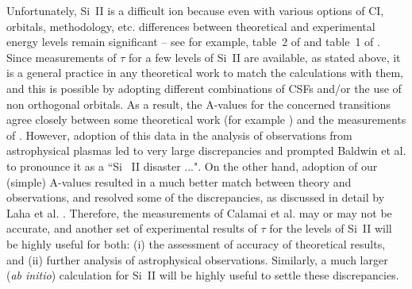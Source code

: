 \documentclass[fleqn]{article}
\begin{document}
Unfortunately, Si~II is a difficult ion because even with various options of CI, orbitals, methodology, etc. differences between theoretical and experimental energy levels remain significant -- see for example, table~2 of \cite{baut1} and table~1 of \cite{sstsi2a}. Since measurements of $\tau$ for a few levels of Si~II are available, as stated above, it is a general practice in any theoretical work to match the calculations with them, and this is possible by adopting different combinations of CSFs and/or the use of non orthogonal orbitals. As a result, the A-values for the concerned transitions agree closely between some theoretical work (for example \cite{sstsi2a}) and the measurements of \cite{cal}. However, adoption of this data in the analysis of observations from astrophysical plasmas led to very large discrepancies and prompted Baldwin et al. \cite{bald} to pronounce it as a ``Si ~II disaster ...". On the other hand, adoption of our (simple) A-values \cite{si2a} resulted in a much better match between theory and observations, and resolved some of the discrepancies, as discussed in detail by Laha et al. \cite{si2b, si2c}. Therefore, the measurements of Calamai et al. \cite{cal} may or may not be accurate, and another set of experimental results of $\tau$ for the levels of Si~II will be highly useful for both: (i) the assessment of accuracy of theoretical results, and (ii) further analysis of astrophysical observations. Similarly, a much larger ({\em ab initio}) calculation for Si~II will be highly useful to settle these discrepancies.
\end{document}
